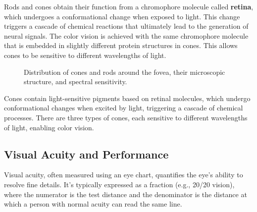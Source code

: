 \documentclass[
  a4paper,
]{book}
\begin{document}
Rods and cones obtain their function from a chromophore molecule called
\textbf{retina}, which undergoes a conformational change when exposed to
light. This change triggers a cascade of chemical reactions that
ultimately lead to the generation of neural signals. The color vision is
achieved with the same chromophore molecule that is embedded in slightly
different protein structures in cones. This allows cones to be sensitive
to different wavelengths of light.

\begin{figure}


\caption{\label{fig-cone-and-rods}Distribution of cones and rods around
the fovea, their microscopic structure, and spectral sensitivity.}

\end{figure}%

Cones contain light-sensitive pigments based on retinal molecules, which
undergo conformational changes when excited by light, triggering a
cascade of chemical processes. There are three types of cones, each
sensitive to different wavelengths of light, enabling color vision.

\subsection{Visual Acuity and
Performance}\label{visual-acuity-and-performance}

Visual acuity, often measured using an eye chart, quantifies the eye's
ability to resolve fine details. It's typically expressed as a fraction
(e.g., 20/20 vision), where the numerator is the test distance and the
denominator is the distance at which a person with normal acuity can
read the same line.
\end{document}
